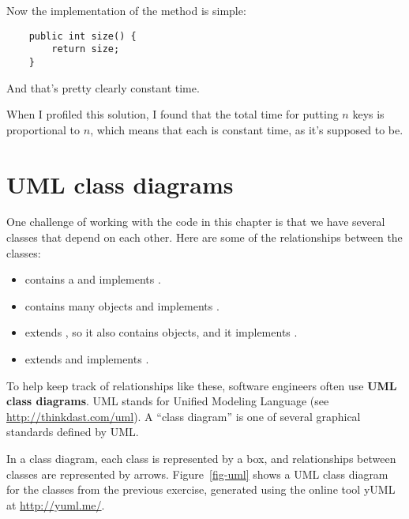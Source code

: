\documentclass[12pt]{book}
\theoremstyle{exercise}
\begin{document}

Now the implementation of the  method is simple:

\begin{verbatim}
    public int size() {
        return size;
    }
\end{verbatim}

And that's pretty clearly constant time.


When I profiled this solution, I found that the total time for putting
$n$ keys is proportional to $n$, which means that each  is
constant time, as it's supposed to be.



\section{UML class diagrams}
\label{uml-class-diagrams}


One challenge of working with the code in this chapter is that we have
several classes that depend on each other. Here are some of the
relationships between the classes:

\begin{itemize}

\item
   contains a  and implements
  .
\item
   contains many  objects and
  implements .
\item
   extends , so it also contains
   objects, and it implements .
\item
   extends  and
  implements .
\end{itemize}

To help keep track of relationships like these, software engineers
often use {\bf UML class diagrams}. UML stands for Unified Modeling
Language
(see \url{http://thinkdast.com/uml}).
A ``class diagram'' is one of several graphical standards defined by UML.

In a class diagram, each class is represented by a box, and
relationships between classes are represented by
arrows. Figure~\ref{fig-uml} shows a UML class diagram for the classes
from the previous exercise, generated using the online tool yUML at
\url{http://yuml.me/}.
\end{document}
